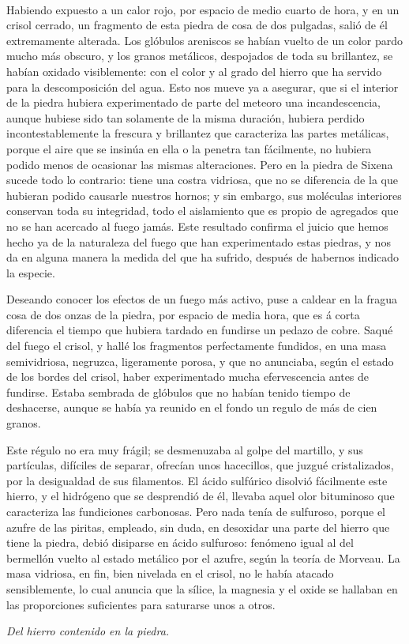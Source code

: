 \documentclass[a4paper, 12pt, oneside, spanish]{article}
\begin{document}
\paragraph{}
Habiendo expuesto a un calor rojo, por espacio de medio cuarto de hora, y en un crisol cerrado, un fragmento de esta piedra de cosa de dos pulgadas, salió de él extremamente alterada. Los glóbulos areniscos se habían vuelto de un color pardo mucho más obscuro, y los granos metálicos, despojados de toda su brillantez, se habían oxidado visiblemente: con el color y al grado del hierro que ha servido para la descomposición del agua. Esto nos mueve ya a asegurar, que si el interior de la piedra hubiera experimentado de parte del meteoro una incandescencia, aunque hubiese sido tan solamente de la misma duración, hubiera perdido incontestablemente la frescura y brillantez que caracteriza las partes metálicas, porque el aire que se insinúa en ella o la penetra tan fácilmente, no hubiera podido menos de ocasionar las mismas alteraciones. Pero en la piedra de Sixena sucede todo lo contrario: tiene una costra vidriosa, que no se diferencia de la que hubieran podido causarle nuestros hornos; y sin embargo, sus moléculas interiores conservan toda su integridad, todo el aislamiento que es propio de agregados que no se han acercado al fuego jamás. Este resultado confirma el juicio que hemos hecho ya de la naturaleza del fuego que han experimentado estas piedras, y nos da en alguna manera la medida del que ha sufrido, después de habernos indicado la especie.

Deseando conocer los efectos de un fuego más activo, puse a caldear en la fragua cosa de dos onzas de la piedra, por espacio de media hora, que es á corta diferencia el tiempo que hubiera tardado en fundirse un pedazo de cobre. Saqué del fuego el crisol, y hallé los fragmentos perfectamente fundidos, en una masa semividriosa, negruzca, ligeramente porosa, y que no anunciaba, según el estado de los bordes del crisol, haber experimentado mucha efervescencia antes de fundirse. Estaba sembrada de glóbulos que no habían tenido tiempo de deshacerse, aunque se había ya reunido en el fondo un regulo de más de cien granos.

Este régulo no era muy frágil; se desmenuzaba al golpe del martillo, y sus partículas, difíciles de separar, ofrecían unos hacecillos, que juzgué cristalizados, por la desigualdad de sus filamentos. El ácido sulfúrico disolvió fácilmente este hierro, y el hidrógeno que se desprendió de él, llevaba aquel olor bituminoso que caracteriza las fundiciones carbonosas. Pero nada tenía de sulfuroso, porque el azufre de las piritas, empleado, sin duda, en desoxidar una parte del hierro que tiene la piedra, debió disiparse en ácido sulfuroso: fenómeno igual al del bermellón vuelto al estado metálico por el azufre, según la teoría de Morveau. La masa vidriosa, en fin, bien nivelada en el crisol, no le había atacado sensiblemente, lo cual anuncia que la sílice, la magnesia y el oxide se hallaban en las proporciones suficientes para saturarse unos a otros.
\begin{center}
\emph{Del hierro contenido en la piedra.}
\end{center}
\end{document}
